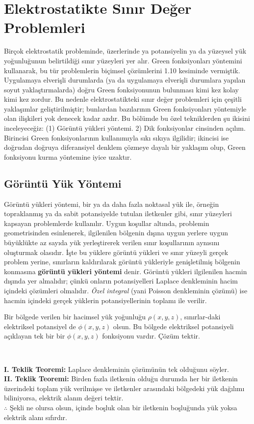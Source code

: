 \cleardoublepage

\chapter{Elektrostatikte Sınır Değer Problemleri}

Birçok elektrostatik probleminde, üzerlerinde ya potansiyelin ya da yüzeysel yük yoğunluğunun belirtildiği sınır yüzeyleri yer alır. Green fonksiyonları yöntemini kullanarak, bu tür problemlerin biçimsel çözümlerini 1.10 kesiminde vermiştik. Uygulamaya elverişli durumlarda (ya da uygulamaya elverişli durumlara yapılan soyut yaklaştırmalarda) doğru Green fonksiyonunun bulunması kimi kez kolay kimi kez zordur. Bu nedenle elektrostatikteki sınır değer problemleri için çeşitli yaklaşımlar geliştirilmiştir; bunlardan bazılarının Green fonksiyonları yöntemiyle olan ilişkileri yok denecek kadar azdır. Bu bölümde bu özel tekniklerden şu ikisini inceleyeceğiz: (1) Görüntü yükleri yöntemi. 2) Dik fonksiyonlar cinsinden açılım. Birincisi Green fonksiyonlarının kullanımıyla sıkı sıkıya ilgilidir; ikincisi ise doğrudan doğruya diferansiyel denklem çözmeye dayalı bir yaklaşım olup, Green fonksiyonu kurma yöntemine iyice uzaktır. 

\section{Görüntü Yük Yöntemi}
Görüntü yükleri yöntemi, bir ya da daha fazla noktasal yük ile, örneğin topraklanmış ya da sabit potansiyelde tutulan iletkenler gibi, sınır yüzeyleri kapsayan problemlerde kullanılır. Uygun koşullar altında, problemin geometrisinden esinlenerek, ilgilenilen bölgenin dışına uygun yerlere uygun büyüklükte az sayıda yük yerleştirerek verilen sınır koşullarının aynısını oluşturmak olasıdır. İşte bu yüklere görüntü yükleri ve sınır yüzeyli gerçek problem yerine, sınırların kaldırılarak görüntü yükleriyle genişletilmiş bölgenin konmasına \textbf{görüntü yükleri yöntemi} denir. Görüntü yükleri ilgilenilen hacmin dışında yer almalıdır; çünkü onların potansiyelleri Laplace denkleminin hacim içindeki çözümleri olmalıdır. \textit{Özel integral} (yani Poisson denkleminin çözümü) ise hacmin içindeki gerçek yüklerin potansiyellerinin toplamı ile verilir.

\begin{definition}
Bir bölgede verilen bir hacimsel yük yoğunluğu $\rho (x,y,z)$, sınırlar-daki elektriksel potansiyel de $\phi (x,y,z)$ olsun. Bu bölgede elektriksel potansiyeli açıklayan tek bir bir $\phi(x,y,z)$ fonksiyonu vardır. Çözüm tektir.

\ 

\noindent \textbf{I. Teklik Teoremi:} Laplace denkleminin çözümünün tek olduğunu söyler.\\
\textbf{II. Teklik Teoremi:} Birden fazla iletkenin olduğu durumda her bir iletkenin üzerindeki toplam yük verilmişse ve iletkenler arasındaki bölgedeki yük dağılımı biliniyorsa, elektrik alanın değeri tektir.\\
$\therefore$ Şekli ne olursa olsun, içinde boşluk olan bir iletkenin boşluğunda yük yoksa elektrik alanı sıfırdır.
    
\end{definition}

